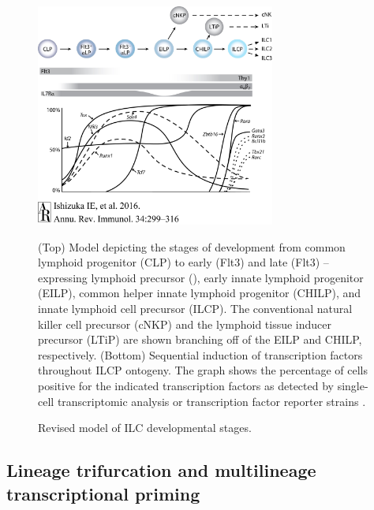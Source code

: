 \begin{figure}[p]
\begin{center}
	\includegraphics[width=0.7\textwidth]{figures/discussion/Discussion_1_development_scheme}
\end{center}
	\caption{Revised model of ILC developmental stages.} 
	(Top) Model depicting the stages of development from common lymphoid progenitor (CLP) to early (Flt3\UP) and late (Flt3\UM) \ab --expressing lymphoid precursor (\aLP), early innate lymphoid progenitor (EILP), common helper innate lymphoid progenitor (CHILP), and innate lymphoid cell precursor (ILCP). The conventional natural killer cell precursor (cNKP) and the lymphoid tissue inducer precursor (LTiP) are shown branching off of the EILP and CHILP, respectively. (Bottom) Sequential induction of transcription factors throughout ILCP ontogeny. The graph shows the percentage of cells positive for the indicated transcription factors as detected by single-cell transcriptomic analysis or transcription factor reporter strains \cite{ishizuka2016, yang2015}.
	\label{fig:dis_devscheme}
\end{figure}

\subsection{Lineage trifurcation and multilineage transcriptional priming}

